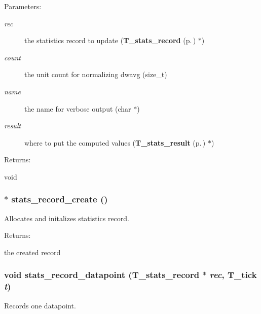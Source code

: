 \begin{Desc}
\item[Parameters: ]\par
\begin{description}
\item[{\em 
rec}]the statistics record to update ({\bf T\_\-stats\_\-record} {\rm (p.\,\pageref{structT__stats__record})} $\ast$) \item[{\em 
count}]the unit count for normalizing dwavg (size\_\-t) \item[{\em 
name}]the name for verbose output (char $\ast$) \item[{\em 
result}]where to put the computed values ({\bf T\_\-stats\_\-result} {\rm (p.\,\pageref{structT__stats__result})} $\ast$) \end{description}
\end{Desc}
\begin{Desc}
\item[Returns: ]\par
void \end{Desc}
\subsubsection{$\ast$ stats\_\-record\_\-create ()}\label{bucket__stats_8h_a9}


Allocates and initalizes statistics record.

\begin{Desc}
\item[Returns: ]\par
the created record \end{Desc}
\subsubsection{\setlength{\rightskip}{0pt plus 5cm}void stats\_\-record\_\-datapoint ({\bf T\_\-stats\_\-record} $\ast$ {\em rec}, {\bf T\_\-tick} {\em t})}\label{bucket__stats_8h_a10}


Records one datapoint.

